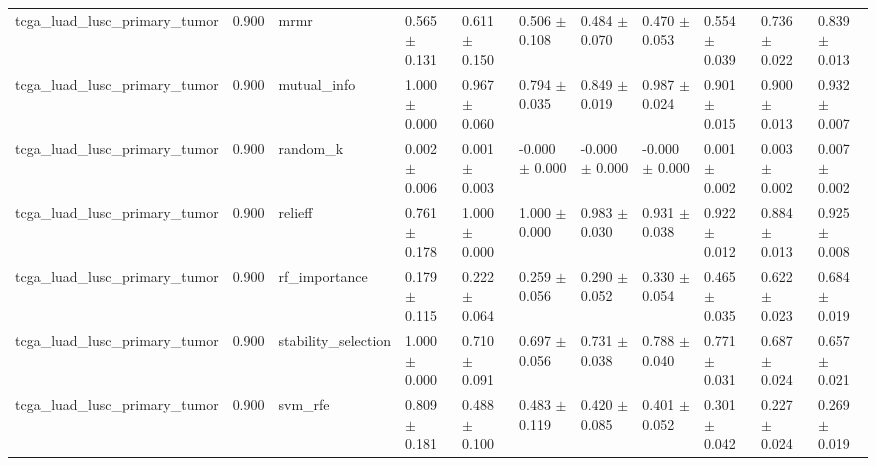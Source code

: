 \begin{table}[t]
\begin{tabular}{lllllllllll}
    tcga\_luad\_lusc\_primary\_tumor & 0.900 & mrmr & 0.565 $\pm$ 0.131 & 0.611 $\pm$ 0.150 & 0.506 $\pm$ 0.108 & 0.484 $\pm$ 0.070 & 0.470 $\pm$ 0.053 & 0.554 $\pm$ 0.039 & 0.736 $\pm$ 0.022 & 0.839 $\pm$ 0.013 \\
    tcga\_luad\_lusc\_primary\_tumor & 0.900 & mutual\_info & 1.000 $\pm$ 0.000 & 0.967 $\pm$ 0.060 & 0.794 $\pm$ 0.035 & 0.849 $\pm$ 0.019 & 0.987 $\pm$ 0.024 & 0.901 $\pm$ 0.015 & 0.900 $\pm$ 0.013 & 0.932 $\pm$ 0.007 \\
    tcga\_luad\_lusc\_primary\_tumor & 0.900 & random\_k & 0.002 $\pm$ 0.006 & 0.001 $\pm$ 0.003 & -0.000 $\pm$ 0.000 & -0.000 $\pm$ 0.000 & -0.000 $\pm$ 0.000 & 0.001 $\pm$ 0.002 & 0.003 $\pm$ 0.002 & 0.007 $\pm$ 0.002 \\
    tcga\_luad\_lusc\_primary\_tumor & 0.900 & relieff & 0.761 $\pm$ 0.178 & 1.000 $\pm$ 0.000 & 1.000 $\pm$ 0.000 & 0.983 $\pm$ 0.030 & 0.931 $\pm$ 0.038 & 0.922 $\pm$ 0.012 & 0.884 $\pm$ 0.013 & 0.925 $\pm$ 0.008 \\
    tcga\_luad\_lusc\_primary\_tumor & 0.900 & rf\_importance & 0.179 $\pm$ 0.115 & 0.222 $\pm$ 0.064 & 0.259 $\pm$ 0.056 & 0.290 $\pm$ 0.052 & 0.330 $\pm$ 0.054 & 0.465 $\pm$ 0.035 & 0.622 $\pm$ 0.023 & 0.684 $\pm$ 0.019 \\
    tcga\_luad\_lusc\_primary\_tumor & 0.900 & stability\_selection & 1.000 $\pm$ 0.000 & 0.710 $\pm$ 0.091 & 0.697 $\pm$ 0.056 & 0.731 $\pm$ 0.038 & 0.788 $\pm$ 0.040 & 0.771 $\pm$ 0.031 & 0.687 $\pm$ 0.024 & 0.657 $\pm$ 0.021 \\
    tcga\_luad\_lusc\_primary\_tumor & 0.900 & svm\_rfe & 0.809 $\pm$ 0.181 & 0.488 $\pm$ 0.100 & 0.483 $\pm$ 0.119 & 0.420 $\pm$ 0.085 & 0.401 $\pm$ 0.052 & 0.301 $\pm$ 0.042 & 0.227 $\pm$ 0.024 & 0.269 $\pm$ 0.019 \\
    \bottomrule
  \end{tabular}
\end{table}
